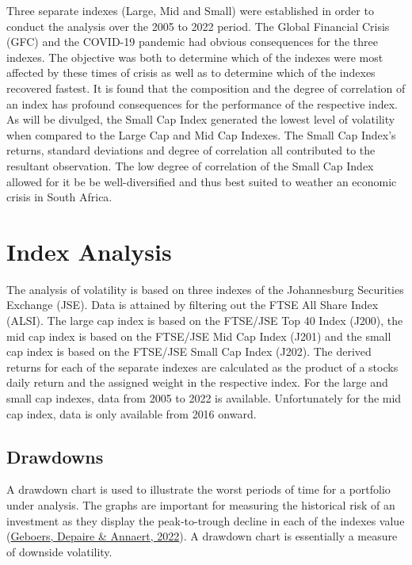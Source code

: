 \documentclass[11pt,preprint, authoryear]{elsarticle}
\numberwithin{equation}{section}
\numberwithin{figure}{section}
\numberwithin{table}{section}
\begin{document}
Three separate indexes (Large, Mid and Small) were established in order
to conduct the analysis over the 2005 to 2022 period. The Global
Financial Crisis (GFC) and the COVID-19 pandemic had obvious
consequences for the three indexes. The objective was both to determine
which of the indexes were most affected by these times of crisis as well
as to determine which of the indexes recovered fastest. It is found that
the composition and the degree of correlation of an index has profound
consequences for the performance of the respective index. As will be
divulged, the Small Cap Index generated the lowest level of volatility
when compared to the Large Cap and Mid Cap Indexes. The Small Cap
Index's returns, standard deviations and degree of correlation all
contributed to the resultant observation. The low degree of correlation
of the Small Cap Index allowed for it be be well-diversified and thus
best suited to weather an economic crisis in South Africa.

\hypertarget{index-analysis}{%
\section{\texorpdfstring{Index Analysis
\label{Index}}{Index Analysis }}\label{index-analysis}}

The analysis of volatility is based on three indexes of the Johannesburg
Securities Exchange (JSE). Data is attained by filtering out the FTSE
All Share Index (ALSI). The large cap index is based on the FTSE/JSE Top
40 Index (J200), the mid cap index is based on the FTSE/JSE Mid Cap
Index (J201) and the small cap index is based on the FTSE/JSE Small Cap
Index (J202). The derived returns for each of the separate indexes are
calculated as the product of a stocks daily return and the assigned
weight in the respective index. For the large and small cap indexes,
data from 2005 to 2022 is available. Unfortunately for the mid cap
index, data is only available from 2016 onward.

\hypertarget{drawdowns}{%
\subsection{Drawdowns}\label{drawdowns}}

A drawdown chart is used to illustrate the worst periods of time for a
portfolio under analysis. The graphs are important for measuring the
historical risk of an investment as they display the peak-to-trough
decline in each of the indexes value
(\protect\hyperlink{ref-geboers2022review}{Geboers, Depaire \& Annaert,
2022}). A drawdown chart is essentially a measure of downside
volatility.
\end{document}
